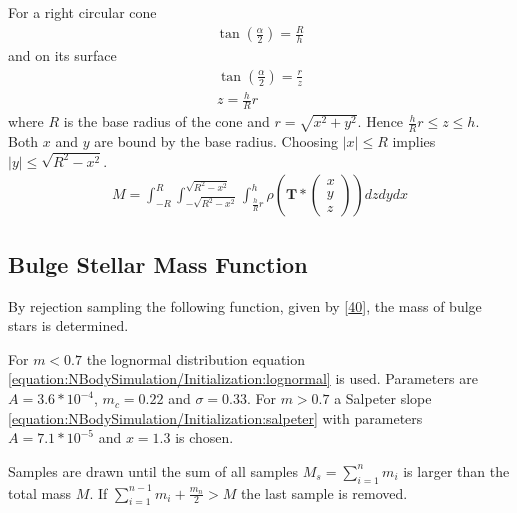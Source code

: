 \documentclass[letterpaper,10pt,english]{sphinxmanual}
\begin{document}
			\sphinxAtStartPar
			For a right circular cone
			\begin{equation*}
			\begin{split}\tan\left (\frac{\alpha }{2}  \right ) = \frac{R}{h}\end{split}
			\end{equation*}
			\sphinxAtStartPar
			and on its surface
			\begin{equation*}
			\begin{split}\tan\left (\frac{\alpha }{2}  \right ) = \frac{r}{z} \\
			z = \frac{h}{R}r\end{split}
			\end{equation*}
			\sphinxAtStartPar
			where \(R\) is the base radius of the cone and \(r = \sqrt{x^2+y^2}\). Hence \(\frac{h}{R}r\leq z\leq h\). Both \(x\) and \(y\) are bound by the base radius.
			Choosing \(\left | x \right | \leq R\) implies \(\left | y \right | \leq \sqrt{R^2-x^2}\).
			\begin{equation*}
			\begin{split}M = \int_{-R}^{R}\int_{-\sqrt{R^2-x^2}}^{\sqrt{R^2-x^2}}\int_{\frac{h}{R}r}^{h} \rho \left ( \mathbf{T}*\begin{pmatrix}x\\ y\\ z\end{pmatrix} \right ) dzdydx\end{split}
			\end{equation*}
			
			\subsection{Bulge Stellar Mass Function}
				\label{\detokenize{NBodySimulation/Initialization:bulge-stellar-mass-function}}
				\sphinxAtStartPar
				By rejection sampling the following function, given by {[}\hyperlink{cite.NBodySimulation/Appendix:id2}{40}{]}, the mass of bulge stars is determined.
				
				\sphinxAtStartPar
				For \(m<0.7\) the log\sphinxhyphen{}normal distribution equation \eqref{equation:NBodySimulation/Initialization:lognormal} is used. Parameters are \(A=3.6*10^{-4}\), \(m_{c}=0.22\) and \(\sigma=0.33\).
				For \(m>0.7\) a Salpeter slope \eqref{equation:NBodySimulation/Initialization:salpeter} with parameters \(A=7.1*10^{-5}\) and \(x=1.3\) is chosen.
				
				\sphinxAtStartPar
				Samples are drawn until the sum of all samples \(M_s = \sum_{i=1}^n m_i\) is larger than the total mass \(M\).
				If \(\sum_{i=1}^{n-1} m_i +\frac{m_n}{2} > M\) the last sample is removed.
				
\end{document}
